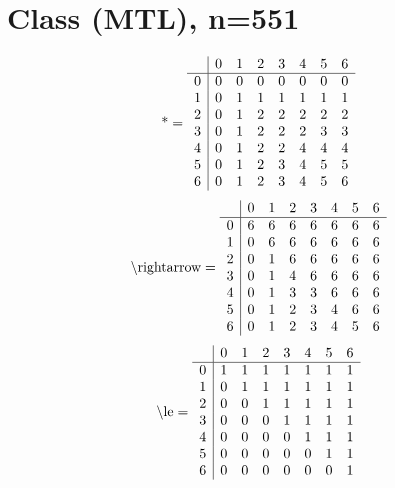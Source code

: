 \documentclass[11pt]{article}
\begin{document}
\section{Class (MTL), n=551}
\[\text{*} = 
\begin{array}{r | r r r r r r r}
 & 0 & 1 & 2 & 3 & 4 & 5 & 6 \\ \hline
0 & 0 & 0 & 0 & 0 & 0 & 0 & 0 \\
1 & 0 & 1 & 1 & 1 & 1 & 1 & 1 \\
2 & 0 & 1 & 2 & 2 & 2 & 2 & 2 \\
3 & 0 & 1 & 2 & 2 & 2 & 3 & 3 \\
4 & 0 & 1 & 2 & 2 & 4 & 4 & 4 \\
5 & 0 & 1 & 2 & 3 & 4 & 5 & 5 \\
6 & 0 & 1 & 2 & 3 & 4 & 5 & 6 \\
\end{array}
\]
\[\text{\textbackslash rightarrow} = 
\begin{array}{r | r r r r r r r}
 & 0 & 1 & 2 & 3 & 4 & 5 & 6 \\ \hline
0 & 6 & 6 & 6 & 6 & 6 & 6 & 6 \\
1 & 0 & 6 & 6 & 6 & 6 & 6 & 6 \\
2 & 0 & 1 & 6 & 6 & 6 & 6 & 6 \\
3 & 0 & 1 & 4 & 6 & 6 & 6 & 6 \\
4 & 0 & 1 & 3 & 3 & 6 & 6 & 6 \\
5 & 0 & 1 & 2 & 3 & 4 & 6 & 6 \\
6 & 0 & 1 & 2 & 3 & 4 & 5 & 6 \\
\end{array}
\]
\[\text{\textbackslash le} = 
\begin{array}{r | r r r r r r r}
 & 0 & 1 & 2 & 3 & 4 & 5 & 6 \\ \hline
0 & 1 & 1 & 1 & 1 & 1 & 1 & 1 \\
1 & 0 & 1 & 1 & 1 & 1 & 1 & 1 \\
2 & 0 & 0 & 1 & 1 & 1 & 1 & 1 \\
3 & 0 & 0 & 0 & 1 & 1 & 1 & 1 \\
4 & 0 & 0 & 0 & 0 & 1 & 1 & 1 \\
5 & 0 & 0 & 0 & 0 & 0 & 1 & 1 \\
6 & 0 & 0 & 0 & 0 & 0 & 0 & 1 \\
\end{array}
\]
\end{document}
